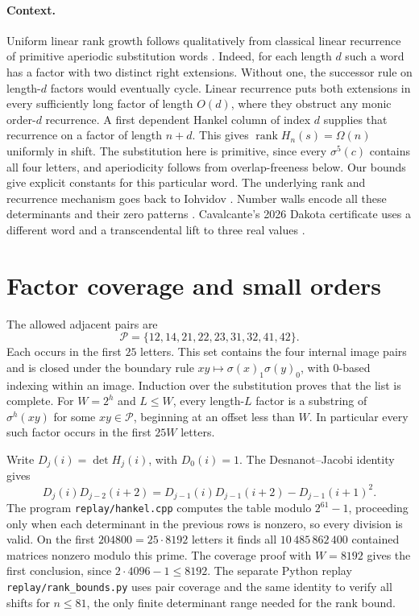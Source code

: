 \documentclass[10pt]{article}
\newcommand{\rank}{\operatorname{rank}}
\begin{document}
\paragraph{Context.}
Uniform linear rank growth follows qualitatively from classical linear recurrence of primitive aperiodic substitution words \cite[\S~7.1]{dhs}. Indeed, for each length \(d\) such a word has a factor with two distinct right extensions. Without one, the successor rule on length-\(d\) factors would eventually cycle. Linear recurrence puts both extensions in every sufficiently long factor of length \(O(d)\), where they obstruct any monic order-\(d\) recurrence. A first dependent Hankel column of index \(d\) supplies that recurrence on a factor of length \(n+d\). This gives \(\rank H_n(s)=\Omega(n)\) uniformly in shift. The substitution here is primitive, since every \(\sigma^5(c)\) contains all four letters, and aperiodicity follows from overlap-freeness below. Our bounds give explicit constants for this particular word. The underlying rank and recurrence mechanism goes back to Iohvidov \cite{ioh,bakan}. Number walls encode all these determinants and their zero patterns \cite{lunnon,adiceam}. Cavalcante's 2026 Dakota certificate uses a different word and a transcendental lift to three real values \cite{cavalcante}.

\section{Factor coverage and small orders}
The allowed adjacent pairs are
\[
\mathcal P=\{12,14,21,22,23,31,32,41,42\}.
\]
Each occurs in the first \(25\) letters. This set contains the four internal image pairs and is closed under the boundary rule \(xy\mapsto \sigma(x)_1\sigma(y)_0\), with \(0\)-based indexing within an image. Induction over the substitution proves that the list is complete. For \(W=2^h\) and \(L\le W\), every length-\(L\) factor is a substring of \(\sigma^h(xy)\) for some \(xy\in\mathcal P\), beginning at an offset less than \(W\). In particular every such factor occurs in the first \(25W\) letters.

Write \(D_j(i)=\det H_j(i)\), with \(D_0(i)=1\). The Desnanot--Jacobi identity gives
\[
 D_j(i)D_{j-2}(i+2)
   =D_{j-1}(i)D_{j-1}(i+2)-D_{j-1}(i+1)^2.
\]
The program \texttt{replay/hankel.cpp} computes the table modulo \(2^{61}-1\), proceeding only when each determinant in the previous rows is nonzero, so every division is valid. On the first \(204800=25\cdot8192\) letters it finds all \(10\,485\,862\,400\) contained matrices nonzero modulo this prime. The coverage proof with \(W=8192\) gives the first conclusion, since \(2\cdot4096-1\le8192\). The separate Python replay \texttt{replay/rank\_bounds.py} uses pair coverage and the same identity to verify all shifts for \(n\le81\), the only finite determinant range needed for the rank bound.
\end{document}
